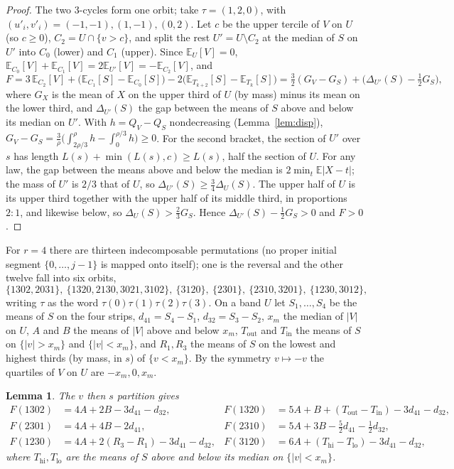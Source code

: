 \documentclass[11pt]{amsart}
\newtheorem{lemma}[theorem]{Lemma}
\theoremstyle{definition}
\theoremstyle{remark}
\numberwithin{equation}{section}
\newcommand{\E}{\mathbb{E}}
\begin{document}
\begin{proof}
The two 3-cycles form one orbit; take $\tau=(1,2,0)$, with $(u'_i,v'_i)=(-1,-1),(1,-1),(0,2)$. Let $c$ be the upper
tercile of $V$ on $U$ (so $c\ge0$), $C_2=U\cap\{v>c\}$, and split the rest $U'=U\setminus C_2$ at the median of $S$ on
$U'$ into $C_0$ (lower) and $C_1$ (upper). Since $\E_U[V]=0$, $\E_{C_0}[V]+\E_{C_1}[V]=2\E_{U'}[V]=-\E_{C_2}[V]$, and
\[
F=3\,\E_{C_2}[V]+\bigl(\E_{C_1}[S]-\E_{C_0}[S]\bigr)-2\bigl(\E_{T_{k+2}}[S]-\E_{T_k}[S]\bigr)
=\tfrac32(G_V-G_S)+\bigl(\Delta_{U'}(S)-\tfrac12G_S\bigr),
\]
where $G_X$ is the mean of $X$ on the upper third of $U$ (by mass) minus its mean on the lower third, and
$\Delta_{U'}(S)$ the gap between the means of $S$ above and below its median on $U'$. With $h=Q_V-Q_S$ nondecreasing
(Lemma~\ref{lem:disp}), $G_V-G_S=\frac3\rho\bigl(\int_{2\rho/3}^\rho h-\int_0^{\rho/3}h\bigr)\ge0$. For the second
bracket, the section of $U'$ over $s$ has length $L(s)+\min(L(s),c)\ge L(s)$, half the section of $U$. For any law,
the gap between the means above and below the median is $2\min_t\E|X-t|$; the mass of $U'$ is $2/3$ that of $U$, so
$\Delta_{U'}(S)\ge\frac34\Delta_U(S)$. The upper half of $U$ is its upper third together with the upper half of its
middle third, in proportions $2:1$, and likewise below, so $\Delta_U(S)>\frac23G_S$. Hence
$\Delta_{U'}(S)-\frac12G_S>0$ and $F>0$.
\end{proof}

For $r=4$ there are thirteen indecomposable permutations (no proper initial segment $\{0,\dots,j-1\}$ is mapped onto
itself); one is the reversal and the other twelve fall into six orbits,
\[
\{1302,2031\},\ \{1320,2130,3021,3102\},\ \{3120\},\ \{2301\},\ \{2310,3201\},\ \{1230,3012\},
\]
writing $\tau$ as the word $\tau(0)\tau(1)\tau(2)\tau(3)$. On a band $U$ let $S_1,\dots,S_4$ be the means of $S$ on the
four strips, $d_{41}=S_4-S_1$, $d_{32}=S_3-S_2$, $x_m$ the median of $|V|$ on $U$, $A$ and $B$ the means of $|V|$ above and
below $x_m$, $T_{\mathrm{out}}$ and $T_{\mathrm{in}}$ the means of $S$ on $\{|v|>x_m\}$ and $\{|v|<x_m\}$, and
$R_1,R_3$ the means of $S$ on the lowest and highest thirds (by mass, in $s$) of $\{v<x_m\}$. By the symmetry
$v\mapsto-v$ the quartiles of $V$ on $U$ are $-x_m,0,x_m$.

\begin{lemma}\label{lem:r4forms}
The $v$ then $s$ partition gives
\begin{align*}
F(1302)&=4A+2B-3d_{41}-d_{32}, & F(1320)&=5A+B+(T_{\mathrm{out}}-T_{\mathrm{in}})-3d_{41}-d_{32},\\
F(2301)&=4A+4B-2d_{41}, & F(2310)&=5A+3B-\tfrac52d_{41}-\tfrac12d_{32},\\
F(1230)&=4A+2(R_3-R_1)-3d_{41}-d_{32}, & F(3120)&=6A+(T_{\mathrm{hi}}-T_{\mathrm{lo}})-3d_{41}-d_{32},
\end{align*}
where $T_{\mathrm{hi}},T_{\mathrm{lo}}$ are the means of $S$ above and below its median on $\{|v|<x_m\}$.
\end{lemma}
\end{document}
